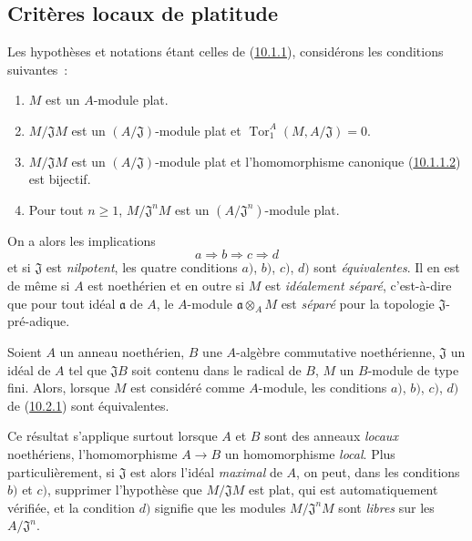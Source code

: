 \subsection{Critères locaux de platitude}
\label{subsection:0.10.2-fr}

\begin{env}[10.2.1]
\label{0.10.2.1-fr}
Les hypothèses et notations étant celles de
(\hyperref[0.10.1.1-fr]{10.1.1}), considérons les conditions suivantes~:
\begin{enumerate}
  \item[$a)$] $M$ est un $A$-module plat.
  \item[$b)$] $M/\mathfrak{J}M$ est un $(A/\mathfrak{J})$-module plat et
    $\operatorname{Tor}_1^A(M,A/\mathfrak{J})=0$.
  \item[$c)$] $M/\mathfrak{J}M$ est un $(A/\mathfrak{J})$-module plat et
    l'homomorphisme canonique (\hyperref[0.10.1.1.2-fr]{10.1.1.2}) est
    bijectif.
  \item[$d)$] Pour tout $n\geq1$, $M/\mathfrak{J}^nM$ est un
    $(A/\mathfrak{J}^n)$-module plat.
\end{enumerate}
On a alors les implications
\[
  a\Rightarrow b\Rightarrow c\Rightarrow d
\]
et si $\mathfrak{J}$ est \emph{nilpotent}, les quatre conditions $a)$, $b)$,
$c)$, $d)$ sont \emph{équivalentes}. Il en est de même si $A$ est noethérien
et en outre si $M$ est \emph{idéalement séparé}, c'est-à-dire que pour tout
idéal $\mathfrak{a}$ de $A$, le $A$-module $\mathfrak{a}\otimes_A M$ est
\emph{séparé} pour la topologie $\mathfrak{J}$-pré-adique.
\end{env}

\begin{env}[10.2.2]
\label{0.10.2.2-fr}
Soient $A$ un anneau noethérien, $B$ une $A$-algèbre commutative noethérienne,
$\mathfrak{J}$ un idéal de $A$ tel que $\mathfrak{J}B$ soit contenu dans le
radical de $B$, $M$ un $B$-module de type fini. Alors, lorsque $M$ est
considéré comme $A$-module, les conditions $a)$, $b)$, $c)$, $d)$ de
(\hyperref[0.10.2.1-fr]{10.2.1}) sont équivalentes.

Ce résultat s'applique surtout lorsque $A$ et $B$ sont des anneaux
\emph{locaux} noethériens, l'homomorphisme $A\to B$ un homomorphisme
\emph{local}. Plus particulièrement, si $\mathfrak{J}$ est alors l'idéal
\emph{maximal} de $A$, on peut, dans les conditions $b)$ et $c)$, supprimer
l'hypothèse que $M/\mathfrak{J}M$ est plat, qui est automatiquement vérifiée,
et la condition $d)$ signifie que les modules $M/\mathfrak{J}^nM$ sont
\emph{libres} sur les $A/\mathfrak{J}^n$.
\end{env}

